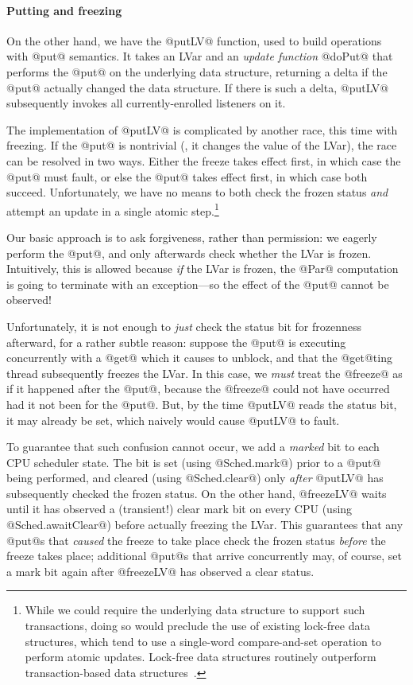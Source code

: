 \paragraph{Putting and freezing}

On the other hand, we have the @putLV@ function, used to build operations with
@put@ semantics.  It takes an LVar and an \emph{update function} @doPut@ that
performs the @put@ on the underlying data structure, returning a delta if the
@put@ actually changed the data structure.  If there is such a delta, @putLV@
subsequently invokes all currently-enrolled listeners on it.

The implementation of @putLV@ is complicated by another race, this time with
freezing.  If the @put@ is nontrivial (\ie, it changes the value of the LVar), the
race can be resolved in two ways.  Either the freeze takes effect first, in
which case the @put@ must fault, or else the @put@ takes effect first, in which case
both succeed.  Unfortunately, we have no means to both check the frozen status
\emph{and} attempt an update in a single atomic step.\footnote{While we could
  require the underlying data structure to support such transactions, doing so
  would preclude the use of existing lock-free data structures, which tend to
  use a single-word compare-and-set operation to perform atomic updates.
  Lock-free data structures routinely outperform transaction-based data
  structures~\cite{practical-lock-freedom}.}

Our basic approach is to ask forgiveness, rather than permission: we eagerly
perform the @put@, and only afterwards check whether the LVar is frozen.
Intuitively, this is allowed because \emph{if} the LVar is frozen, the @Par@
computation is going to terminate with an exception---so the effect of the @put@
cannot be observed!  

Unfortunately, it is not enough to \emph{just} check the status bit for frozenness afterward,
for a rather subtle reason: suppose the @put@ is executing concurrently with a
@get@ which it causes to unblock, and that the @get@ting thread subsequently
freezes the LVar.  In this case, we \emph{must} treat the @freeze@ as if it
happened after the @put@, because the @freeze@ could not have occurred had it
not been for the @put@. But, by the time @putLV@ reads the status bit, it may
already be set, which naively would cause @putLV@ to fault.

To guarantee that such confusion cannot occur, we add a \emph{marked} bit to
each CPU scheduler state.  The bit is set (using @Sched.mark@) prior to a @put@
being performed, and cleared (using @Sched.clear@) only \emph{after} @putLV@ has
subsequently checked the frozen status.  On the other hand, @freezeLV@ waits
until it has observed a (transient!) clear mark bit on every CPU (using
@Sched.awaitClear@) before actually freezing the LVar.  This guarantees that any
@put@s that \emph{caused} the freeze to take place check the frozen status
\emph{before} the freeze takes place; additional @put@s that arrive concurrently
may, of course, set a mark bit again after @freezeLV@ has observed a clear status.

